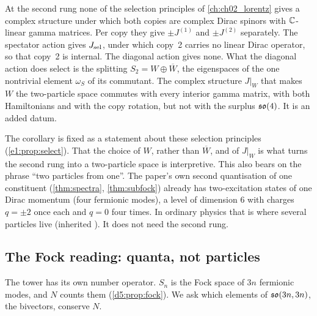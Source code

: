 \begin{corollary}
\label{e1:cor:nocx}
At the second rung none of the selection principles of \cref{ch:ch02_lorentz} gives a complex structure under which both copies are complex Dirac spinors
with $\mathbb{C}$-linear gamma matrices. Per copy they give $\pm J^{(1)}$ and $\pm J^{(2)}$ separately. The spectator action gives
$J_{\rm sel}$, under which copy~2 carries no linear Dirac operator, so that copy~2 is internal. The diagonal action gives none. What the
diagonal action does select is the splitting $S_2=W\oplus\overline W$, the eigenspaces of the one nontrivial element $\omega_S$ of its commutant.
The complex structure $J|_W$ that makes $W$ the two-particle space commutes with every interior gamma matrix, with both Hamiltonians and with the copy
rotation, but not with the surplus $\mathfrak{so}(4)$. It is an added datum.
\end{corollary}

The corollary is fixed as a statement about these selection principles (\cref{e1:prop:select}). That the choice of $W$, rather than
$\overline W$, and of $J|_W$ is what turns the second rung into a two-particle space is interpretive. This also bears on the phrase
``two particles from one''. The paper's own second quantisation of one constituent (\cref{thm:spectra}, \cref{thm:subfock}) already has two-excitation states of one Dirac momentum (four fermionic modes), a level of dimension $6$ with charges $q=\pm2$ once each and $q=0$ four times.
In ordinary physics that is where several particles live (inherited \cite{Fock32}). It does not need the second rung.

\subsection{The Fock reading: quanta, not particles}
\label{e1:sec:fock}

The tower has its own number operator. $S_n$ is the Fock space of $3n$ fermionic modes, and $N$ counts them (\cref{d5:prop:fock}). We ask which elements of $\mathfrak{so}(3n,3n)$, the bivectors, conserve $N$.

